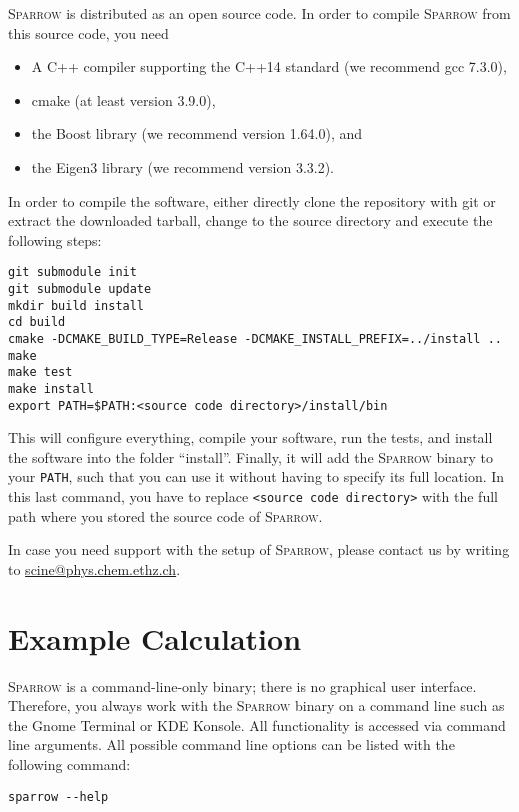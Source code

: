 \documentclass[]{tufte-book}
\begin{document}
\textsc{Sparrow} is distributed as an open source code. In order to compile \textsc{Sparrow} from this source code, you need
\begin{itemize}
 \item A C++ compiler supporting the C++14 standard (we recommend gcc 7.3.0),
 \item cmake (at least version 3.9.0),
 \item the Boost library (we recommend version 1.64.0), and
 \item the Eigen3 library (we recommend version 3.3.2).
\end{itemize}
In order to compile the software, either directly clone the repository with git or extract the downloaded tarball, change 
to the source directory and execute the following steps:
\begin{verbatim}
git submodule init
git submodule update
mkdir build install
cd build
cmake -DCMAKE_BUILD_TYPE=Release -DCMAKE_INSTALL_PREFIX=../install ..
make
make test
make install
export PATH=$PATH:<source code directory>/install/bin
\end{verbatim}
This will configure everything, compile your software, run the tests, and install the software 
into the folder ``install''. Finally, it will add the \textsc{Sparrow} binary to your \texttt{PATH}, such that you can use
it without having to specify its full location. In this last command, you have to replace \texttt{<source code directory>}
with the full path where you stored the source code of \textsc{Sparrow}.

In case you need support with the setup of \textsc{Sparrow}, please contact us by writing to \href{scine@phys.chem.ethz.ch}{scine@phys.chem.ethz.ch}.



\chapter{Example Calculation}

\textsc{Sparrow} is a command-line-only binary; there is no graphical user interface. Therefore, you always work with the
\textsc{Sparrow} binary on a command line such as the Gnome Terminal or KDE Konsole.
All functionality is accessed via command line arguments. All possible command line options can be listed with the following command:
\begin{verbatim}
sparrow --help
\end{verbatim}
\end{document}

